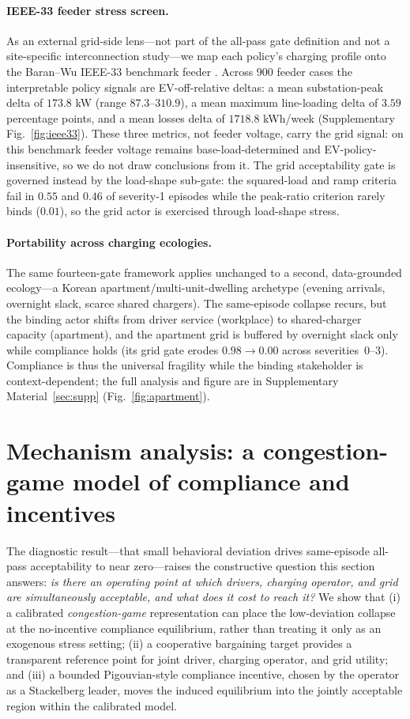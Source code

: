 \documentclass[12pt]{article}
\begin{document}
\paragraph{IEEE-33 feeder stress screen.} As an external grid-side lens---not part of the all-pass gate definition and not a site-specific interconnection study---we map each policy's charging profile onto the Baran--Wu IEEE-33 benchmark feeder \cite{baran1989,thurner2018,pandapowerdoc}. Across 900 feeder cases the interpretable policy signals are EV-off-relative deltas: a mean substation-peak delta of $173.8$ kW (range $87.3$--$310.9$), a mean maximum line-loading delta of $3.59$ percentage points, and a mean losses delta of $1718.8$ kWh/week (Supplementary Fig.~\ref{fig:ieee33}). These three metrics, not feeder voltage, carry the grid signal: on this benchmark feeder voltage remains base-load-determined and EV-policy-insensitive, so we do not draw conclusions from it. The grid acceptability gate is governed instead by the load-shape sub-gate: the squared-load and ramp criteria fail in $0.55$ and $0.46$ of severity-1 episodes while the peak-ratio criterion rarely binds ($0.01$), so the grid actor is exercised through load-shape stress.

\paragraph{Portability across charging ecologies.}\label{sec:ecology} The same fourteen-gate framework applies unchanged to a second, data-grounded ecology---a Korean apartment/multi-unit-dwelling archetype (evening arrivals, overnight slack, scarce shared chargers). The same-episode collapse recurs, but the binding actor shifts from driver service (workplace) to shared-charger capacity (apartment), and the apartment grid is buffered by overnight slack only while compliance holds (its grid gate erodes $0.98\to0.00$ across severities~0--3). Compliance is thus the universal fragility while the binding stakeholder is context-dependent; the full analysis and figure are in Supplementary Material~\ref{sec:supp} (Fig.~\ref{fig:apartment}).


\section{Mechanism analysis: a congestion-game model of compliance and incentives}\label{sec:game}

The diagnostic result---that small behavioral deviation drives same-episode all-pass
acceptability to near zero---raises the constructive question this section answers:
\emph{is there an operating point at which drivers, charging operator, and grid are simultaneously
acceptable, and what does it cost to reach it?} We show that (i) a calibrated
\emph{congestion-game} representation can place the low-deviation collapse at the
no-incentive compliance equilibrium, rather than treating it only as an exogenous stress
setting; (ii) a cooperative bargaining target provides a transparent reference point for
joint driver, charging operator, and grid utility; and (iii) a bounded Pigouvian-style compliance
incentive, chosen by the operator as a Stackelberg leader, moves the induced equilibrium
into the jointly acceptable region within the calibrated model.
\end{document}

